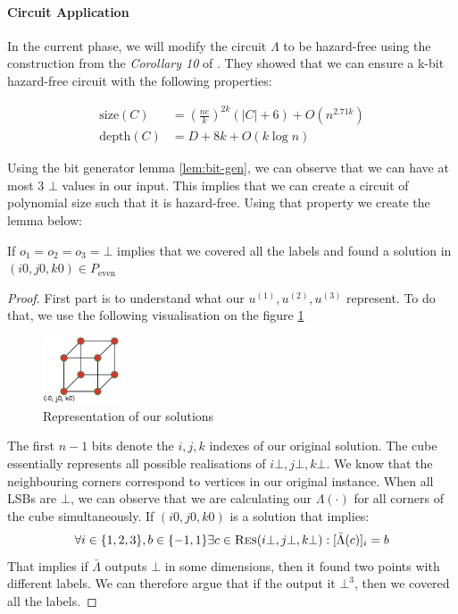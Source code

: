 \paragraph{Circuit Application}

In the current phase, we will modify the circuit $\Lambda$ to be hazard-free using the construction
from the \textit{Corollary 10} of \cite{ikenmeyer_complexity_2019}.
They showed that we can ensure a k-bit hazard-free circuit with the following properties:

\begin{align*}
\text{size}(C)  & =  \left( \frac{ne}{k}  \right)^{2k} (|C| + 6) + O (n^{2.71k}) \\
\text{depth}(C)  & =  D + 8k + O(k \log n)
\end{align*}

Using the bit generator lemma \ref{lem:bit-gen}, we can observe that we can have at most 3 $\bot$ values 
in our input. This implies that we can create a circuit of polynomial size such that it is hazard-free.
Using that property we create the lemma below:

\begin{lemma}
    \label{lem:circuit}
    If $o_1 = o_2 = o_3 = \bot$ implies that we covered all the labels and found a solution
    in $(i0,j0,k0) \in P_{\text{even}}$
\end{lemma}


\begin{proof}
    First part is to understand what our $u^{(1)}, u^{(2)}, u^{(3)}$
    represent. To do that, we use the following visualisation on the figure \ref{fig:main-proof:cube-vis}
    \begin{figure}[h!]
        \centering
        \includegraphics[width=0.2\textwidth]{assets/3d-cube.png}
        \caption{Representation of our solutions}\label{fig:main-proof:cube-vis}
    \end{figure}
    The first $n-1$ bits denote the $i,j,k$ indexes of our original solution.
    The cube essentially represents all possible realisations of $i\bot, j\bot, k\bot$.
    We know that the neighbouring corners correspond to vertices in our original instance.
    When all LSBs are $\bot$, we can observe that we are calculating our $\Lambda(\cdot)$
    for all corners of the cube simultaneously. If $(i0, j0, k0)$ is a solution
    that implies:
    $$
    \forall i \in \{1,2,3\}, b \in \{-1, 1\} \exists c \in \textsc{Res}(i\bot, j\bot, k\bot): [\bar{\Lambda}(c)]_i = b
    $$
    That implies if $\bar{\Lambda}$ outputs $\bot$ in some dimensions, then it found two points with different labels. We can therefore
    argue that if the output it $\bot^3$, then we covered all the labels.
\end{proof}


